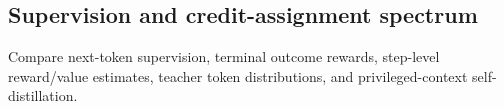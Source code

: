 \subsection{Supervision and credit-assignment spectrum}
Compare next-token supervision, terminal outcome rewards, step-level reward/value
estimates, teacher token distributions, and privileged-context self-distillation.
